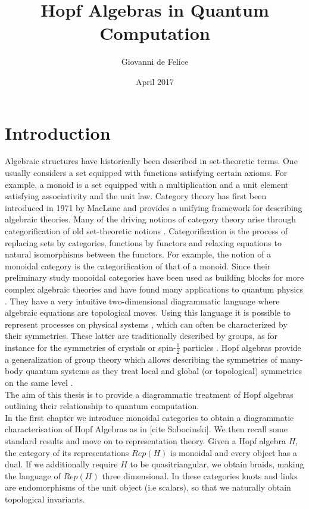 \documentclass{article}
\title{Hopf Algebras in Quantum Computation}
\author{Giovanni de Felice}
\date{April 2017}
\begin{document}
\maketitle
\tableofcontents

\pagebreak
\section{Introduction}
Algebraic structures have historically been described in set-theoretic terms. One usually considers a set equipped with functions satisfying certain axioms. For example, a monoid is a set equipped with a multiplication and a unit element satisfying associativity and the unit law. Category theory has first been introduced in 1971 by MacLane \cite{MacLane71} and provides a unifying framework for describing algebraic theories. Many of the driving notions of category theory arise through categorification of old set-theoretic notions \cite{Baez98}. Categorification is the process of replacing sets by categories, functions by functors and relaxing equations to natural isomorphisms between the functors. For example, the notion of a monoidal category is the categorification of that of a monoid. Since their preliminary study \cite{MacLane71} monoidal categories have been used as building blocks for more complex algebraic theories and have found many applications to quantum physics \cite{Abramsky04} \cite{Bartlett05} \cite{Vicary12} \cite{Rowell17}. They have a very intuitive two-dimensional diagrammatic language where algebraic equations are topological moves. Using this language it is possible to represent processes on physical systems \cite{Coecke17}, which can often be characterized by their symmetries. These latter are traditionally described by groups, as for instance for the symmetries of crystals \cite{Auslander65} or spin-$\frac{1}{2}$ particles \cite{Pauncz67}. Hopf algebras provide a generalization of group theory which allows describing the symmetries of many-body quantum systems as they treat local and global (or topological) symmetries on the same level \cite{Slingerland02}.\\
The aim of this thesis is to provide a diagrammatic treatment of Hopf algebras outlining their relationship to quantum computation.\\
In the first chapter we introduce monoidal categories to obtain a diagrammatic characterisation of Hopf Algebras as in [cite Sobocinski]. We then recall some standard results and move on to representation theory. Given a Hopf algebra $H$, the category of its representations $Rep(H)$ is monoidal and every object has a dual. If we additionally require $H$ to be quasitriangular, we obtain braids, making the language of $Rep(H)$ three dimensional. In these categories knots and links are endomorphisms of the unit object (i.e scalars), so that we naturally obtain topological invariants.\\
\end{document}
